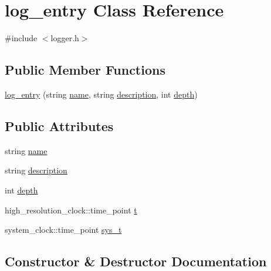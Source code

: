 \hypertarget{classlog__entry}{}\section{log\+\_\+entry Class Reference}
\label{classlog__entry}


{\ttfamily \#include $<$logger.\+h$>$}

\subsection*{Public Member Functions}
\begin{DoxyCompactItemize}
\item 
\hyperlink{classlog__entry_ac5c6d1454c9285c418e3359b82cdd573}{log\+\_\+entry} (string \hyperlink{classlog__entry_ac65943b778a5978a579d984a6b682def}{name}, string \hyperlink{classlog__entry_a35acb4013a550dd9926c6cccd93300dd}{description}, int \hyperlink{classlog__entry_abfcc98c447997da2eb424a73f5f06da4}{depth})
\end{DoxyCompactItemize}
\subsection*{Public Attributes}
\begin{DoxyCompactItemize}
\item 
string \hyperlink{classlog__entry_ac65943b778a5978a579d984a6b682def}{name}
\item 
string \hyperlink{classlog__entry_a35acb4013a550dd9926c6cccd93300dd}{description}
\item 
int \hyperlink{classlog__entry_abfcc98c447997da2eb424a73f5f06da4}{depth}
\item 
high\+\_\+resolution\+\_\+clock\+::time\+\_\+point \hyperlink{classlog__entry_a9477b6872dfa3609db1e4e6a97ed5dba}{t}
\item 
system\+\_\+clock\+::time\+\_\+point \hyperlink{classlog__entry_a2877798c71ba0f0762b821633c8bc517}{sys\+\_\+t}
\end{DoxyCompactItemize}


\subsection{Constructor \& Destructor Documentation}
\mbox{\label{classlog__entry_ac5c6d1454c9285c418e3359b82cdd573}} 
